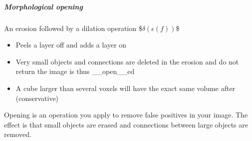 \documentclass[letterpaper,10pt,english]{sphinxmanual}
\begin{document}
\begin{sphinxVerbatim}[commandchars=\\\{\}]
\PYG{p}{[}\PYG{p}{]} \PYG{p}{[}\PYG{p}{]}
\PYG{p}{[}\PYG{p}{]}
\end{sphinxVerbatim}

\noindent{}


\subparagraph{Morphological opening}
\label{\detokenize{04-BasicSegmentation_Part2:morphological-opening}}
\sphinxAtStartPar
An erosion followed by a dilation operation
\$\(\delta(\epsilon(f))\)\$
\begin{itemize}
\item {} 
\sphinxAtStartPar
Peels a layer off and adds a layer on

\item {} 
\sphinxAtStartPar
Very small objects and connections are deleted in the erosion and do not return the image is thus \_\_open\_\_ed

\item {} 
\sphinxAtStartPar
A cube larger than several voxels will have the exact same volume after (conservative)

\end{itemize}

\sphinxAtStartPar
Opening is an operation you apply to remove false positives in your image. The effect is that small objects are erased and connections between large objects are removed.
\end{document}
